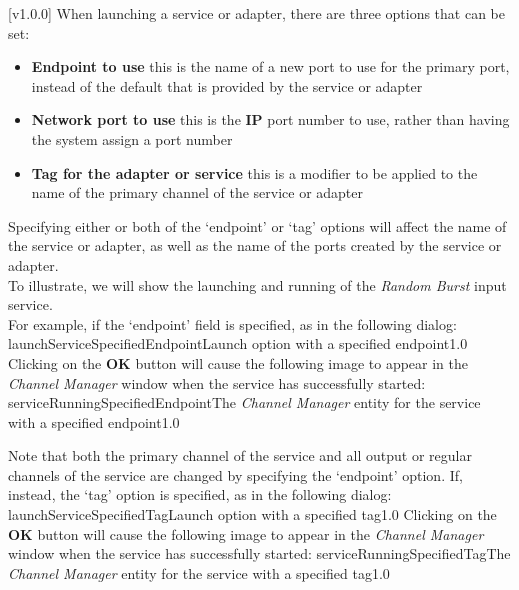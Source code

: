 [v1.0.0]
When launching a service or adapter, there are three options that can be set:
\begin{itemize}
\item\textbf{Endpoint to use} this is the name of a new \yarp{} port to use for the
primary port, instead of the default that is provided by the service or adapter
\item\exSp\textbf{Network port to use} this is the \textbf{IP} port number to use, rather
than having the system assign a port number
\item\exSp\textbf{Tag for the adapter or service} this is a modifier to be applied to the
name of the primary channel of the service or adapter
\end{itemize}

Specifying either or both of the `endpoint' or `tag' options will affect the name of the
service or adapter, as well as the name of the \yarp{} ports created by the service or
adapter.\\

To illustrate, we will show the launching and running of the \emph{Random Burst} input
service.\\

For example, if the `endpoint' field is specified, as in the following dialog:
%
{launchServiceSpecifiedEndpoint}{Launch option with a specified endpoint}{1.0}
\condPage{}
Clicking on the \textbf{OK} button will cause the following image to appear in the
\emph{Channel Manager} window when the service has successfully started:
%
{serviceRunningSpecifiedEndpoint}{The \emph{Channel Manager} entity for the service with a
specified endpoint}{1.0}

Note that both the primary channel of the service and all output or regular channels of
the service are changed by specifying the `endpoint' option.
If, instead, the `tag' option is specified, as in the following dialog:
%
{launchServiceSpecifiedTag}{Launch option with a specified tag}{1.0}
\condPage{}
Clicking on the \textbf{OK} button will cause the following image to appear in the
\emph{Channel Manager} window when the service has successfully started:
%
{serviceRunningSpecifiedTag}{The \emph{Channel Manager} entity for the service with a
specified tag}{1.0}

